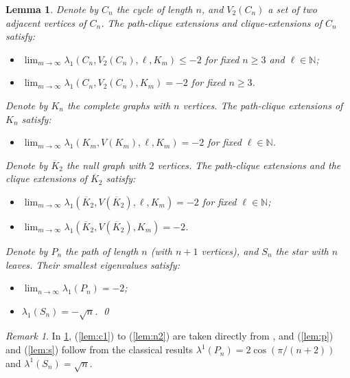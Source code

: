 \documentclass[11pt]{article}
\newtheorem{lemma}[theorem]{Lemma}
\theoremstyle{definition}
\theoremstyle{remark}
\newtheorem*{remark}{Remark}
\newcommand{\la}{\lambda}
\newcommand{\N}{\mathbb{N}}
\begin{document}
\begin{lemma} \label{lem:hoffman}
    Denote by $C_n$ the cycle of length $n$, and $V_2(C_n)$ a set of two adjacent vertices of $C_n$. The path-clique extensions and clique-extensions of $C_n$ satisfy:
    \begin{itemize}
        \item[(c1)] $\lim_{m\to\infty} \la_1(C_n, V_2(C_n), \ell, K_m) \le -2$ for fixed $n \ge 3$ and $\ell \in \N$; 
        \item[(c2)] $\lim_{m\to\infty} \la_1(C_n, V_2(C_n), K_m) = -2$ for fixed $n \ge 3$. 
    \end{itemize}
    Denote by $K_n$ the complete graphs with $n$ vertices. The path-clique extensions of $K_n$ satisfy:
    \begin{itemize}
        \item[(k)] $\lim_{m\to\infty} \la_1(K_m, V(K_m), \ell, K_m) = -2$ for fixed $\ell \in \N$. 
    \end{itemize}
    Denote by $\overline{K}_2$ the null graph with $2$ vertices. The path-clique extensions and the clique extensions of $\overline{K}_2$ satisfy:
    \begin{itemize}
        \item[(n1)] $\lim_{m\to\infty} \la_1(\overline{K}_2, V(\overline{K}_2), \ell, K_m) = -2$ for fixed $\ell \in \N$; 
        \item[(n2)] $\lim_{m\to\infty} \la_1(\overline{K}_2, V(\overline{K}_2), K_m) = -2$. 
    \end{itemize}
    Denote by $P_n$ the path of length $n$ (with $n+1$ vertices), and $S_n$ the star with $n$ leaves. Their smallest eigenvalues satisfy:
    \begin{itemize}
        \item[(p)] $\lim_{n\to\infty} \la_1(P_n) = -2$; 
        \item[(s)] $\la_1(S_n) = -\sqrt{n}$.  \qed
    \end{itemize}
\end{lemma}

\begin{remark}
    In \cref{lem:hoffman}, (\ref{lem:c1}) to (\ref{lem:n2}) are taken directly from \cite[Lemmas~2.4 to 2.9]{H77a}, and (\ref{lem:p}) and (\ref{lem:s}) follow from the classical results $\la^1(P_n) = 2\cos(\pi/(n+2))$ and $\la^1(S_n) = \sqrt{n}$.
\end{remark}
\end{document}
